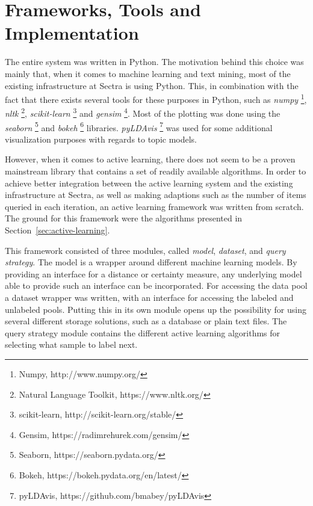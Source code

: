 \section{Frameworks, Tools and Implementation}

The entire system was written in Python.
The motivation behind this choice was mainly that, when it comes to machine learning and text mining, most of the existing infrastructure at Sectra is using Python.
This, in combination with the fact that there exists several tools for these purposes in Python, such as \textit{numpy} \footnote{Numpy, http://www.numpy.org/}, \textit{nltk} \footnote{Natural Language Toolkit, https://www.nltk.org/}, \textit{scikit-learn} \footnote{scikit-learn, http://scikit-learn.org/stable/} and \textit{gensim} \footnote{Gensim, https://radimrehurek.com/gensim/}.
Most of the plotting was done using the \textit{seaborn} \footnote{Seaborn, https://seaborn.pydata.org/} and \textit{bokeh} \footnote{Bokeh, https://bokeh.pydata.org/en/latest/} libraries.
\textit{pyLDAvis} \footnote{pyLDAvis, https://github.com/bmabey/pyLDAvis} was used for some additional visualization purposes with regards to topic models.

However, when it comes to active learning, there does not seem to be a proven mainstream library that contains a set of readily available algorithms.
In order to achieve better integration between the active learning system and the existing infrastructure at Sectra, as well as making adaptions such as the number of items queried in each iteration, an active learning framework was written from scratch.
The ground for this framework were the algorithms presented in Section~\ref{sec:active-learning}.

This framework consisted of three modules, called \textit{model}, \textit{dataset}, and \textit{query strategy}.
The model is a wrapper around different machine learning models.
By providing an interface for a distance or certainty measure, any underlying model able to provide such an interface can be incorporated.
For accessing the data pool a dataset wrapper was written, with an interface for accessing the labeled and unlabeled pools.
Putting this in its own module opens up the possibility for using several different storage solutions, such as a database or plain text files.
The query strategy module contains the different active learning algorithms for selecting what sample to label next.